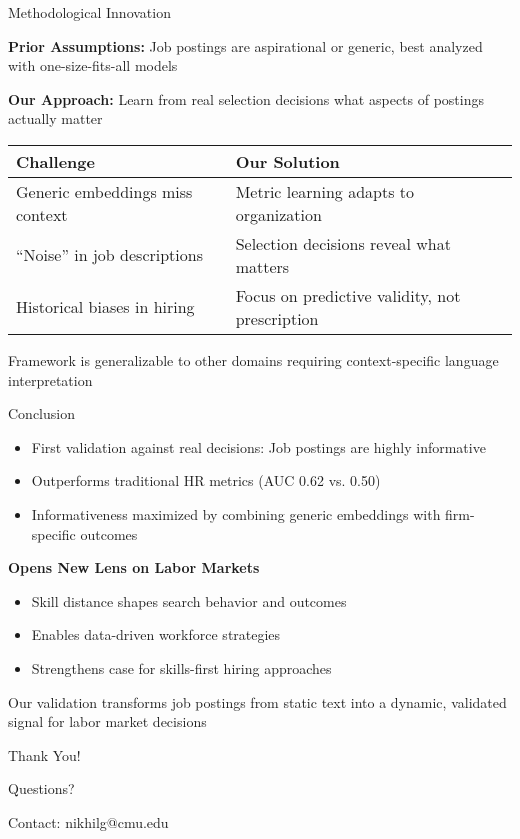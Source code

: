 \documentclass{beamer}
\begin{document}
\begin{frame}{Methodological Innovation}
\begin{tcolorbox}[colback=boxbackground,colframe=boxframe,sharp corners]
\textbf{Prior Assumptions:}
Job postings are aspirational or generic, best analyzed with one-size-fits-all models
\end{tcolorbox}

\begin{tcolorbox}[colback=boxbackground,colframe=boxframe,sharp corners]
\textbf{Our Approach:}
Learn from real selection decisions what aspects of postings actually matter
\end{tcolorbox}

\begin{table}
\centering
\begin{tabular}{l l}
\toprule
\textbf{Challenge} & \textbf{Our Solution} \\
\midrule
Generic embeddings miss context & Metric learning adapts to organization \\
``Noise'' in job descriptions & Selection decisions reveal what matters \\
Historical biases in hiring & Focus on predictive validity, not prescription \\
\bottomrule
\end{tabular}
\end{table}

Framework is generalizable to other domains requiring context-specific language interpretation
\end{frame}

\begin{frame}{Conclusion}
\begin{itemize}
    \item First validation against real decisions: Job postings are highly informative
    \item Outperforms traditional HR metrics (AUC 0.62 vs. 0.50)
    \item Informativeness maximized by combining generic embeddings with firm-specific outcomes
\end{itemize}

\begin{tcolorbox}[colback=boxbackground,colframe=boxframe,sharp corners]
\textbf{Opens New Lens on Labor Markets}
\begin{itemize}
    \item Skill distance shapes search behavior and outcomes
    \item Enables data-driven workforce strategies
    \item Strengthens case for skills-first hiring approaches
\end{itemize}
\end{tcolorbox}

Our validation transforms job postings from static text into a dynamic, validated signal for labor market decisions
\end{frame}

\begin{frame}
\centering
\huge Thank You!

\vspace{2em}
\Large Questions?

\vspace{2em}
\normalsize Contact: nikhilg@cmu.edu
\end{frame}
\end{document}
